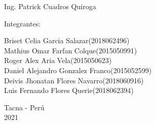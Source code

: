\documentclass{article}
\begin{document}
\begin{titlepage}
\begin{center}
\vspace*{0.1in}
\begin{large}
 Ing. Patrick Cuadros Quiroga\\
\end{large}

\vspace*{0.2in}
\vspace*{0.1in}
\begin{large}

Integrantes: \\
\begin{flushleft}
Briset Celia Garcia Salazar\hfill(2018062496) \\
Mathius Omar Farfan Colque\hfill(2015050991)\\
Roger Alex Aria Vela\hfill(2015050623)\\
Daniel Alejandro Gonzalez Franco\hfill(2015052599)\\
Deivis Jhonatan Flores Navarro\hfill(2018060916)\\
Luis Fernando Flores Querie\hfill(2018062394)\\

\end{flushleft}
\end{large}

\vspace*{0.1in}
\begin{large}
Tacna - Perú\\
2021
\end{large}
\end{center}
\end{titlepage}

\vspace*{\fill}
	
\end{document}

